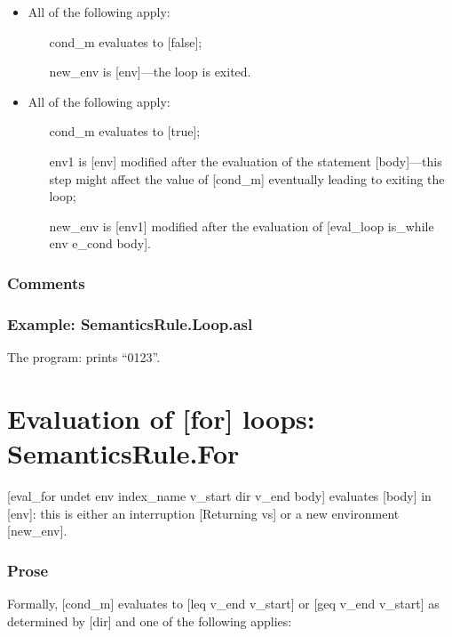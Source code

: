 \documentclass{book}
\begin{document}
    \begin{itemize}
    \item All of the following apply:
      \begin{itemize}
      \item [cond\_m] evaluates to [false];
      \item [new\_env] is [env]---the loop is exited. 
      \end{itemize}
    \item All of the following apply:
      \begin{itemize}
      \item [cond\_m] evaluates to [true];
      \item [env1] is [env] modified after the evaluation of the statement
       [body]---this step might affect the value of [cond\_m] eventually leading
       to exiting the loop;
      \item [new\_env] is [env1] modified after the evaluation of [eval\_loop
        is\_while env e\_cond body].
      \end{itemize}
    \end{itemize}

    \subsubsection{Comments}

    \subsubsection{Example: SemanticsRule.Loop.asl}
    The program:
    prints ``0123''.

\section{Evaluation of [for] loops: SemanticsRule.For \label{sec:SemanticsRule.For}}
[eval\_for undet env index\_name v\_start dir v\_end body] evaluates [body] in
[env]: this is either an interruption [Returning vs] or a new environment
[new\_env].

    \subsubsection{Prose}
    Formally, [cond\_m] evaluates to [leq v\_end v\_start] or [geq v\_end v\_start]
    as determined by [dir] and one of the following applies:
\end{document}
